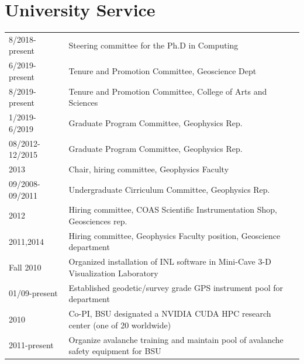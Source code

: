 \documentclass[11pt]{article}
\renewcommand\arraystretch{1}
\begin{document}
\section*{University Service}
\begingroup
\renewcommand\arraystretch{0.7}
\begin{longtable}{p{1.2in}|p{5.7in}}
8/2018-present & Steering committee for the Ph.D in Computing \\
6/2019-present & Tenure and Promotion Committee, Geoscience Dept \\
8/2019-present & Tenure and Promotion Committee, College of Arts and Sciences \\
1/2019-6/2019 & Graduate Program Committee, Geophysics Rep. \\
08/2012-12/2015 & Graduate Program Committee, Geophysics Rep. \\
2013 & Chair, hiring committee, Geophysics Faculty \\ 
09/2008-09/2011 & Undergraduate Cirriculum Committee, Geophysics Rep. \\
2012 & Hiring committee, COAS Scientific Instrumentation Shop, Geosciences rep. \\
2011,2014 & Hiring committee, Geophysics Faculty position, Geoscience department \\
Fall 2010 & Organized installation of INL software in Mini-Cave 3-D Visualization Laboratory \\
01/09-present & Established geodetic/survey grade GPS instrument pool for department \\
2010 & Co-PI, BSU designated a NVIDIA CUDA HPC research center (one of 20 worldwide)  \\
2011-present & Organize avalanche training and maintain pool of avalanche safety equipment for BSU \\ 
\end{longtable}
\endgroup
\end{document}
